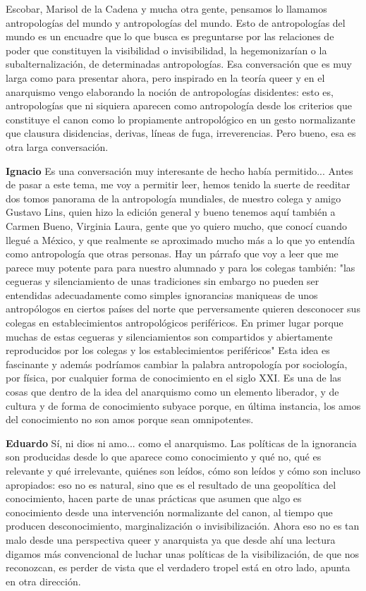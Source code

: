 \documentclass[
  spanish,
  11pt,
  a4paper,
]{scrbook}
\newenvironment{transcripcion}{
    \begin{list}{}{
        \setlength{\leftmargin}{1.5em}  %
        \setlength{\rightmargin}{0em}
        \setlength{\itemsep}{0.2em}     %
        \setlength{\parsep}{0.0em}
        \setlength{\listparindent}{0pt}
    }
}{
    \end{list}
}
\newcommand{\personaje}[1]{\textbf{#1}\quad}
\begin{document}
\begin{transcripcion}
Escobar, Marisol de la Cadena y mucha otra gente, pensamos lo llamamos antropologías del mundo y antropologías del mundo. Esto de antropologías del mundo es un encuadre que lo que busca es preguntarse por las relaciones de poder que constituyen la visibilidad o invisibilidad, la hegemonizarían o la subalternalización, de determinadas antropologías. Esa conversación que es muy larga como para presentar ahora, pero inspirado en la teoría queer y en el anarquismo vengo elaborando la noción de antropologías disidentes: esto es, antropologías que ni siquiera aparecen como antropología desde los criterios que constituye el canon como lo propiamente antropológico en un gesto normalizante que clausura disidencias, derivas, líneas de fuga, irreverencias. Pero bueno, esa es otra larga conversación.

\item \personaje{Ignacio} Es una conversación muy interesante de hecho había permitido... Antes de pasar a este tema, me voy a permitir leer, hemos tenido la suerte de reeditar dos tomos panorama de la antropología mundiales, de nuestro colega y amigo Gustavo Lins, quien hizo la edición general y bueno tenemos aquí también a Carmen Bueno, Virginia Laura, gente que yo quiero mucho, que conocí cuando llegué a México, y que realmente se aproximado mucho más a lo que yo entendía como antropología que otras personas. Hay un párrafo que voy a leer que me parece muy potente para para nuestro alumnado y para los colegas también: "las cegueras y silenciamiento de unas tradiciones sin embargo no pueden ser entendidas adecuadamente como simples ignorancias maniqueas de unos antropólogos en ciertos países del norte que perversamente quieren desconocer sus colegas en establecimientos antropológicos periféricos. En primer lugar porque muchas de estas cegueras y silenciamientos son compartidos y abiertamente reproducidos por los colegas y los establecimientos periféricos" Esta idea es fascinante y además podríamos cambiar la palabra antropología por sociología, por física, por cualquier forma de conocimiento en el siglo XXI. Es una de las cosas que dentro de la idea del anarquismo como un elemento liberador, y de cultura y de forma de conocimiento subyace porque, en última instancia, los amos del conocimiento no son amos porque sean omnipotentes.

\item \personaje{Eduardo} Sí, ni dios ni amo... como el anarquismo. Las políticas de la ignorancia son producidas desde lo que aparece como conocimiento y qué no, qué es relevante y qué irrelevante, quiénes son leídos, cómo son leídos y cómo son incluso apropiados: eso no es natural, sino que es el resultado de una geopolítica del conocimiento, hacen parte de unas prácticas que asumen que algo es conocimiento desde una intervención normalizante del canon, al tiempo que producen desconocimiento, marginalización o invisibilización. Ahora eso no es tan malo desde una perspectiva queer y anarquista ya que desde ahí una lectura digamos más convencional de luchar unas políticas de la visibilización, de que nos reconozcan, es perder de vista que el verdadero tropel está en otro lado, apunta en otra dirección.


\end{transcripcion}
\end{document}
